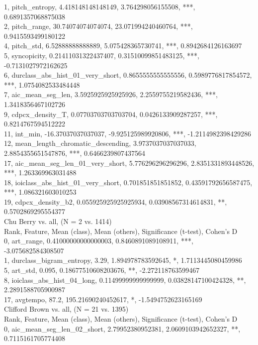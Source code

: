 1, pitch_entropy, 4.418148148148149, 3.764298056155508, ***, 0.6891357068875038\\
2, pitch_range, 30.74074074074074, 23.071994240460764, ***, 0.9415593499180122\\
4, pitch_std, 6.52888888888889, 5.075428365730741, ***, 0.8942684126163697\\
5, syncopicity, 0.21411031322437407, 0.31510099851483125, ***, -0.7131027972162625\\
6, durclass_abs_hist_01_very_short, 0.8655555555555556, 0.5989776817854572, ***, 1.0754082533484448\\
7, aic_mean_seg_len, 3.5925925925925926, 2.2559755219582436, ***, 1.3418356467102726\\
9, cdpcx_density_T, 0.07703703703703704, 0.0426133909287257, ***, 0.8214767594512222\\
11, int_min, -16.37037037037037, -9.925125989920806, ***, -1.2114982398429286\\
12, mean_length_chromatic_descending, 3.9737037037037033, 2.8854355651547876, ***, 0.6466239807437564\\
17, aic_mean_seg_len_01_very_short, 5.776296296296296, 2.8351331893448526, ***, 1.263369963031488\\
18, ioiclass_abs_hist_01_very_short, 0.701851851851852, 0.43591792656587475, ***, 1.086321603010253\\
19, cdpcx_density_b2, 0.055925925925925934, 0.03908567314614831, **, 0.5702869295554377\\
Chu Berry vs. all, (N = 2 vs. 1414)\\
Rank, Feature, Mean (class), Mean (others), Significance (t-test), Cohen's D\\
0, art_range, 0.41000000000000003, 0.8460891089108911, ***, -3.075682584308507\\
1, durclass_bigram_entropy, 3.29, 1.894978783592645, *, 1.7113445080459986\\
5, art_std, 0.095, 0.18677510608203676, **, -2.272118763599467\\
8, ioiclass_abs_hist_04_long, 0.11499999999999999, 0.03828147100424328, **, 2.2891588705900987\\
17, avgtempo, 87.2, 195.21690240452617, *, -1.5494752623165169\\
Clifford Brown vs. all, (N = 21 vs. 1395)\\
Rank, Feature, Mean (class), Mean (others), Significance (t-test), Cohen's D\\
0, aic_mean_seg_len_02_short, 2.79952380952381, 2.0609103942652327, **, 0.7115161705774408\\
